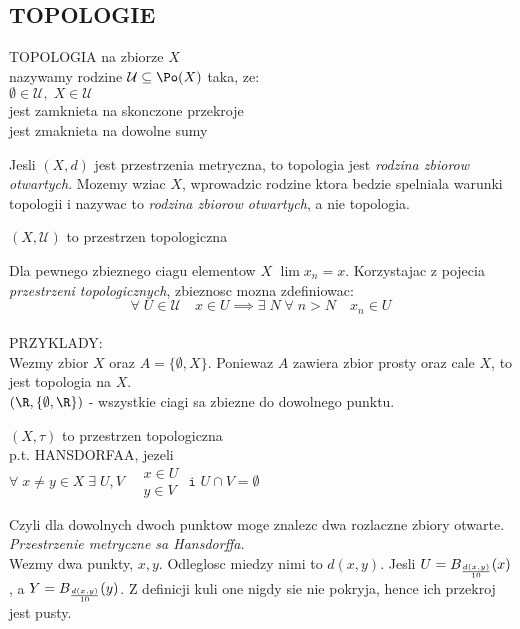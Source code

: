 \documentclass{article}
\begin{document}
\subsection*{TOPOLOGIE}
    \begin{center}\large
        \color{def}TOPOLOGIA \color{txt}na zbiorze $X$ \\
        nazywamy rodzine $\mathcal{U}\subseteq \Po(X)$ taka, ze:\medskip\normalsize\\
        $\emptyset\in\mathcal{U}, \; X\in \mathcal{U}$\smallskip\\
        jest zamknieta na skonczone przekroje\smallskip\\
        jest zmaknieta na dowolne sumy
    \end{center}\bigskip
    Jesli $(X, d)$ jest przestrzenia metryczna, to \color{emp}topologia jest \emph{rodzina zbiorow otwartych}\color{txt}. Mozemy wziac $X$, wprowadzic rodzine ktora bedzie spelniala warunki topologii i nazywac to \emph{rodzina zbiorow otwartych}, a nie topologia.\bigskip
    \begin{center}
        \large $(X, \mathcal{U})$ to \color{def}przestrzen topologiczna
    \end{center}\bigskip
    Dla pewnego zbieznego ciagu elementow $X$ $\lim x_n=x$. Korzystajac z pojecia \emph{przestrzeni topologicznych}, zbieznosc mozna zdefiniowac:
        $$\forall\;U\in\mathcal{U}\quad x\in U\implies\exists\;N\;\forall\;n>N\quad x_n\in U$$
    \bigskip\\
    \large\color{emp}PRZYKLADY:\color{txt}\normalsize\bigskip\\
    Wezmy zbior $X$ oraz $A=\{\emptyset, X\}$. Poniewaz $A$ zawiera zbior prosty oraz cale $X$, to jest topologia na $X$.\medskip\\
    $(\R, \{\emptyset,\R\})$ - wszystkie ciagi sa zbiezne do dowolnego punktu.\bigskip\\
    \bigskip

    \begin{center}
        $(X, \tau)$ to przestrzen topologiczna\smallskip\\
        \large\color{def}p.t. HANSDORFAA\color{txt}, jezeli\smallskip\\
    $\forall\;x\neq y\in X\;\exists\;U,V\quad \begin{matrix}x\in U\\y\in V\end{matrix} \texttt{ i }U\cap V=\emptyset$
    \end{center}
    Czyli dla dowolnych dwoch punktow moge znalezc dwa rozlaczne zbiory otwarte.\medskip\\
    \emph{\color{acc}Przestrzenie metryczne sa Hansdorffa.}\smallskip\\
    Wezmy dwa punkty, $x, y$. Odleglosc miedzy nimi to $d(x,y)$. Jesli $U=B_{{d(x,y)\over 10}}(x)$, a $Y=B_{{d(x,y)\over 10}}(y)$. Z definicji kuli one nigdy sie nie pokryja, hence ich przekroj jest pusty.\bigskip\\
    \bigskip\\
\end{document}
